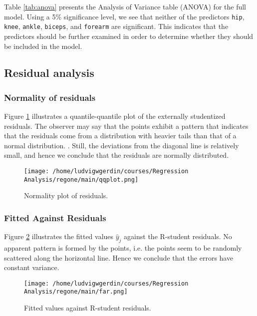 \documentclass[11pt]{article}
\begin{document}
Table \ref{tab:anova} presents the Analysis of Variance table (ANOVA) for the full model. Using a
5\% significance level, we see that neither of the predictors \texttt{hip}, \texttt{knee}, \texttt{ankle},
\texttt{biceps}, and \texttt{forearm} are significant. This indicates that the predictors should be 
further examined in order to determine whether they should be included in the model. 





\subsection{Residual analysis}
\label{sec:orgfb382da}
\subsubsection{Normality of residuals}
\label{sec:org295b7f0}

Figure \ref{fig:orgcfc50b5} illustrates a quantile-quantile plot of the externally studentized residuals.
The observer may say that the  points exhibit a pattern that indicates that the residuals come from
a distribution with heavier tails than that of a normal distribution. 
\cite{Montgomery2012}. Still, the deviations from the diagonal line is relatively small, and hence
we conclude that the residuals are normally distributed.

\begin{figure}[htbp]
\centering
\texttt{[image: /home/ludvigwgerdin/courses/Regression Analysis/regone/main/qqplot.png]}
\caption{\label{fig:orgcfc50b5}
Normality plot of residuals.}
\end{figure}

\subsubsection{Fitted Against Residuals}
\label{sec:orgd597a1e}

Figure \ref{fig:orgdc13e43} illustrates the fitted values \(\hat y_j\) against the R-student residuals. No apparent 
pattern is formed by the points, i.e. the points seem to be randomly scattered along the horizontal line.
Hence we conclude that the errors have constant variance.

\begin{figure}[htbp]
\centering
\texttt{[image: /home/ludvigwgerdin/courses/Regression Analysis/regone/main/far.png]}
\caption{\label{fig:orgdc13e43}
Fitted values against R-student residuals.}
\end{figure}
\end{document}
